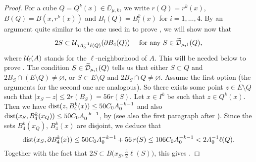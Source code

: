 \begin{proof}
	For a cube $Q=Q^k(x)\in\DD_{\mu,k}$, we write $r(Q)=r^k(x)$, $B(Q)=B(x,r^k(x))$ and
	$B_i(Q) = B_i^k(x)$ for $i=1,\ldots,4$. 
	By an argument quite similar to the one used in \cite[Theorem 3.2]{David-Mattila} to prove , we will show now that
	\begin{equation}\label{eqdisb4'}
		2S\subset {\mathcal U}_{5A_0^{-1}\ell(Q)}(\partial B_4(Q))\quad \mbox{ for any $S\in{\widetilde{{\mathcal D}}}_{\mu,1}(Q)$,}
	\end{equation}
	where ${\mathcal U}_\ell(A)$ stands for the $\ell$-neighborhood of $A$.
	This will be needed below to prove 
	. The condition $S\in{\widetilde{{\mathcal D}}}_{\mu,1}(Q)$ tells us that either $S\subset Q$ and 
	$2B_S\cap (E\setminus Q)\neq \varnothing$, or $S\subset E\setminus Q$ and 
	$2B_S\cap  Q\neq \varnothing$. Assume the first option (the arguments for the second one are analogous). So there exists some point $z\in E\setminus Q$ such that $|x_S-z|\leq 2r(B_S)=56r(S)$.
	Let $x\in I^k$ be such that $z\in Q^k(x)$. Then we have ${\rm dist}(z,B_4^k(x))\leq 50C_0A_0^{-k-1}$
	and also ${\rm dist}(x_S,B_4^k(x_Q))\leq 50C_0A_0^{-k-1}$, by 
	\cite[(3.50)]{David-Mattila} (see also the first paragraph after \cite[(3.61)]{David-Mattila}). 
	Since the sets $B_4^k(x_Q)$, $B_4^k(x)$ are disjoint, we deduce that
	$${\rm dist}(x_S,\partial B_4^k(x))\leq 50C_0A_0^{-k-1} + 56\,r(S) \leq 106C_0A_0^{-k-1}< 2A_0^{-1}\ell(Q).
	$$
	Together with the fact that $2S\subset B\big(x_S,\tfrac52\ell(S)\big)$, this gives .
	

\end{proof}
